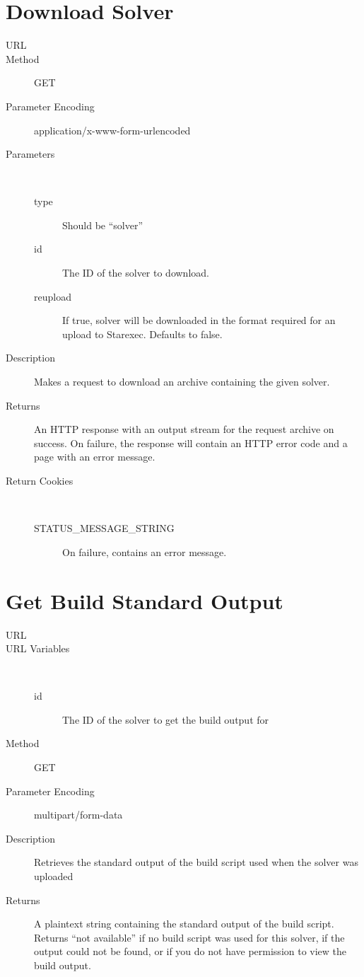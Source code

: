\section{Download Solver}
\begin{description}
\item [URL] 
\item [Method] GET
\item [Parameter Encoding] application/x-www-form-urlencoded
\item [Parameters] \
	\begin{description}
	\item [type]  Should be “solver”
	\item [id]  The ID of the solver to download.
	\item [reupload]  If true, solver will be downloaded in the format required for an upload to Starexec. Defaults to false.
	\end{description}
\item [Description] Makes a request to download an archive containing the given solver.
\item [Returns] An HTTP response with an output stream for the request archive on success. On failure, the response will contain an HTTP error code and a page with an error message.
\item [Return Cookies] \
	\begin{description}
	\item [STATUS\_MESSAGE\_STRING]  On failure, contains an error message.
	\end{description}
\end{description}

\section{Get Build Standard Output}
\begin{description}
\item [URL] 
\item [URL Variables] \
	\begin{description}
	\item [id] \type{Integer} The ID of the solver to get the build output for
	\end{description}
\item [Method] GET
\item [Parameter Encoding] multipart/form-data
\item [Description] Retrieves the standard output of the build script used when the solver was uploaded
\item [Returns] A plaintext string containing the standard output of the build script. Returns “not available” if no build script was used for this solver, if the output could not be found, or if you do not have permission to view the build output.
\end{description}


